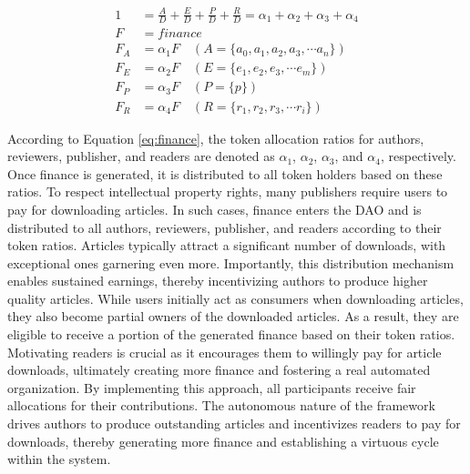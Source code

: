\documentclass[lettersize,journal]{IEEEtran}
\begin{document}
\begin{equation}
  \begin{aligned}
    1 &= \frac{A}{D} + \frac{E}{D} + \frac{P}{D} + \frac{R}{D} = \alpha_1 + \alpha_2 + \alpha_3 + \alpha_4 \\
    F &= finance \\
    F_A &= \alpha_1 F \quad (A=\{a_0, a_1, a_2, a_3, \cdots a_n\}) \\
    F_E &= \alpha_2 F \quad (E=\{e_1, e_2, e_3, \cdots e_m\}) \\
    F_P &= \alpha_3 F \quad (P=\{p\}) \\ 
    F_R &= \alpha_4 F \quad (R=\{r_1, r_2, r_3, \cdots r_i\})
  \end{aligned}
  \label{eq:finance}
\end{equation}


According to Equation \ref{eq:finance}, the token allocation ratios for authors, reviewers, publisher, and readers are denoted as $\alpha_1$, $\alpha_2$, $\alpha_3$, and $\alpha_4$, respectively. Once finance is generated, it is distributed to all token holders based on these ratios. 
To respect intellectual property rights, many publishers require users to pay for downloading articles. In such cases, finance enters the DAO and is distributed to all authors, reviewers, publisher, and readers according to their token ratios. Articles typically attract a significant number of downloads, with exceptional ones garnering even more. Importantly, this distribution mechanism enables sustained earnings, thereby incentivizing authors to produce higher quality articles. 
While users initially act as consumers when downloading articles, they also become partial owners of the downloaded articles. As a result, they are eligible to receive a portion of the generated finance based on their token ratios. Motivating readers is crucial as it encourages them to willingly pay for article downloads, ultimately creating more finance and fostering a real automated organization. 
By implementing this approach, all participants receive fair allocations for their contributions. The autonomous nature of the framework drives authors to produce outstanding articles and incentivizes readers to pay for downloads, thereby generating more finance and establishing a virtuous cycle within the system.
\end{document}
